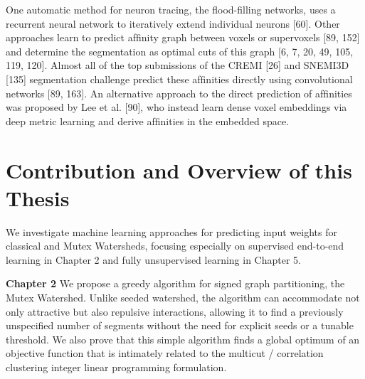 One automatic method for neuron tracing, the ﬂood-ﬁlling networks, uses a recurrent neural network to iteratively extend individual neurons [60]. Other approaches learn to predict afﬁnity graph between voxels or supervoxels [89, 152] and determine the segmentation as optimal cuts of this graph [6, 7, 20, 49, 105, 119, 120]. Almost all of the top submissions of the CREMI [26] and SNEMI3D [135] segmentation challenge predict these afﬁnities directly using convolutional networks [89, 163]. An alternative approach to the direct prediction of afﬁnities was proposed by Lee et al. [90], who instead learn dense voxel embeddings via deep metric learning and derive afﬁnities in the embedded space.

\section{Contribution and Overview of this Thesis}
We investigate machine learning approaches for predicting input weights for classical and Mutex Watersheds, focusing especially on supervised end-to-end learning in Chapter 2 and fully unsupervised learning in Chapter 5.

\textbf{Chapter 2}
We propose a greedy algorithm for signed graph partitioning, the Mutex Watershed. Unlike seeded watershed, the algorithm can accommodate not only attractive but also repulsive interactions, allowing it to ﬁnd a previously unspeciﬁed number of segments without the need for explicit seeds or a tunable threshold. We also prove that this simple algorithm ﬁnds a global optimum of an objective function that is intimately related to the multicut / correlation clustering integer linear programming formulation.

